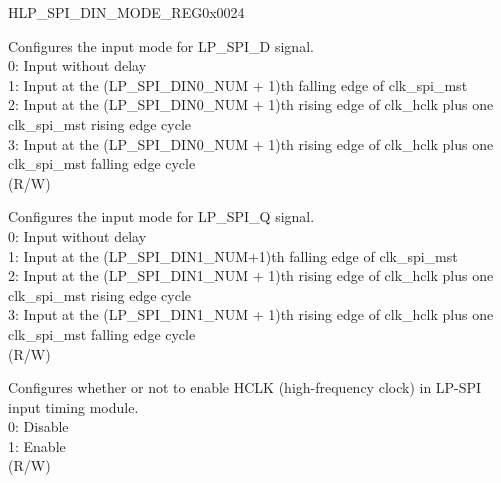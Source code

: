 \begin{register}{H}{LP\_SPI\_DIN\_MODE\_REG}{0x0024}\label{regdesc:LPSPIDINMODEREG}
%
%
%
%
%
%
%
\regnewline%
\begin{regdesc}\begin{reglist}
\label{fielddesc:LPSPIDIN0MODE}\item [LP\_SPI\_DIN0\_MODE] Configures the input mode for LP\_SPI\_D signal.\\
0: Input without delay\\
1: Input at the (LP\_SPI\_DIN0\_NUM + 1)th falling edge of clk\_spi\_mst\\
2: Input at the (LP\_SPI\_DIN0\_NUM + 1)th rising edge of clk\_hclk plus one clk\_spi\_mst rising edge cycle\\
3: Input at the (LP\_SPI\_DIN0\_NUM + 1)th rising edge of clk\_hclk plus one clk\_spi\_mst falling edge cycle\\
 (R/W)
\label{fielddesc:LPSPIDIN1MODE}\item [LP\_SPI\_DIN1\_MODE] Configures the input mode for LP\_SPI\_Q signal.\\
0: Input without delay\\
1: Input at the (LP\_SPI\_DIN1\_NUM+1)th falling edge of clk\_spi\_mst\\
2: Input at the (LP\_SPI\_DIN1\_NUM + 1)th rising edge of clk\_hclk plus one clk\_spi\_mst rising edge cycle\\
3: Input at the (LP\_SPI\_DIN1\_NUM + 1)th rising edge of clk\_hclk plus one clk\_spi\_mst falling edge cycle\\
(R/W)
\label{fielddesc:LPSPITIMINGHCLKACTIVE}\item [LP\_SPI\_TIMING\_HCLK\_ACTIVE] Configures whether or not to enable HCLK (high-frequency clock) in LP-SPI input timing module.\\
0: Disable\\
1: Enable\\
(R/W)
\end{reglist}\end{regdesc}
\end{register}


